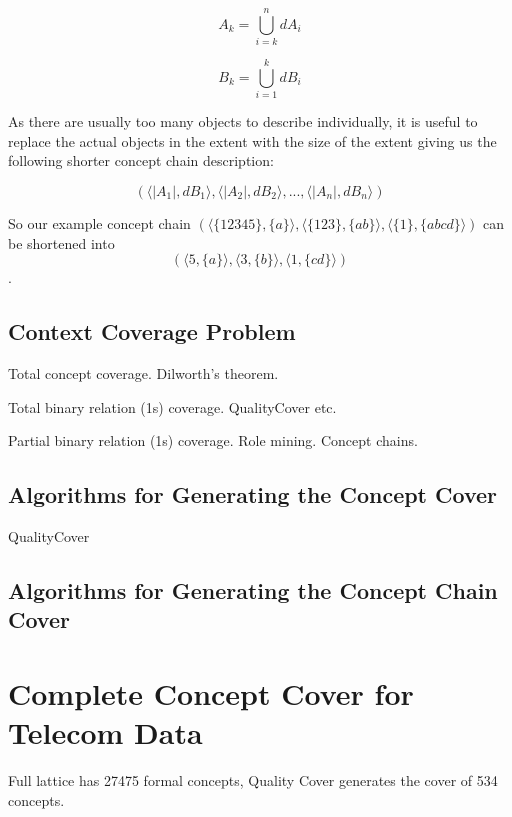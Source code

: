 \documentclass[acmconf,authordraft]{acmart}
\begin{document}
\begin{equation}
A_k = \bigcup_{i=k}^{n} dA_i
\end{equation}

\begin{equation}
B_k = \bigcup_{i=1}^{k} dB_i
\end{equation}

As there are usually too many objects to describe  individually, it is useful to replace the actual objects in the extent with the size of the extent giving us the following shorter concept chain description:

\begin{displaymath}
 (\langle|A_1|, dB_1 \rangle,\langle |A_2|, dB_2 \rangle,  ..., \langle |A_n|, dB_n \rangle)
\end{displaymath}

So our example concept chain 
$(\langle \{12345\}, \{a\} \rangle,
 \langle \{123\}, \{ab\} \rangle,  \langle \{1\}, \{abcd\} \rangle)$
 can be shortened into
 \begin{displaymath}
 (\langle 5, \{a\} \rangle,
 \langle 3, \{b\} \rangle,  
 \langle 1, \{cd\} \rangle)
 \end{displaymath}.


\subsection{Context Coverage Problem}
Total concept coverage. Dilworth's theorem.

Total binary relation (1s) coverage. QualityCover etc.

Partial binary relation (1s) coverage. Role mining. Concept chains.


\subsection{Algorithms for Generating the Concept Cover}
QualityCover

\subsection{Algorithms for Generating the Concept Chain Cover}

\section{Complete Concept Cover for Telecom Data}
Full lattice has 27475 formal concepts, Quality Cover generates the cover of 534 concepts.
\end{document}
